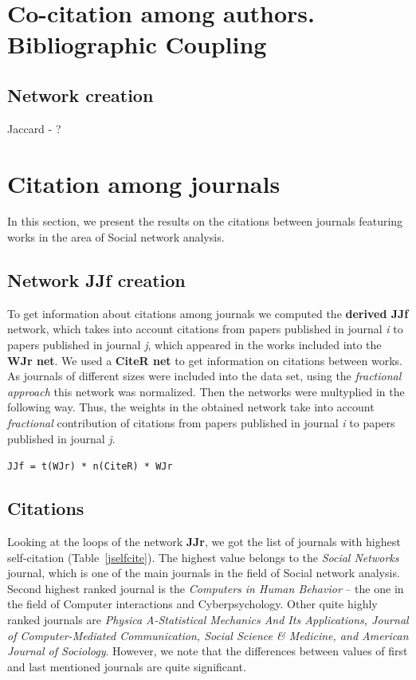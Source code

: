 \documentclass[11pt]{article} %
\newcommand{\Remark}[1]{\ifodd\value{page} \normalmarginpar
 \else \reversemarginpar \fi \marginpar{{\footnotesize #1}} }
\begin{document}
\section{Co-citation among authors. Bibliographic Coupling }

\subsection{Network creation} 

Jaccard - ? \Remark{Try to compute}

\section{Citation among journals}

In this section, we present the results on the citations between journals featuring works in the area of Social network analysis. 

\subsection{Network JJf creation}

To get information about citations among journals we computed the \textbf{derived JJf} network, which takes into account citations from papers published in journal \textit{i} to papers published in journal \textit{j}, which appeared in the works included into the \textbf{WJr net}. We used a \textbf{CiteR net} to get information on citations between works. As journals of different sizes were included into the data set, using the \textit{fractional approach} this network was normalized. Then the networks were multyplied in the following way. Thus, the weights in the obtained network take into account \textit{fractional} contribution of citations from papers published in journal \textit{i} to papers published in journal \textit{j}.   \medskip 

\texttt{JJf = t(WJr) * n(CiteR) * WJr}

\subsection{Citations}

Looking at the loops of the network \textbf{JJr}, we got the list of journals with highest self-citation (Table~\ref{jselfcite}). The highest value belongs to the \textit{Social Networks} journal, which is one of the main journals in the field of Social network analysis. Second highest ranked journal is the \textit{Computers in Human Behavior} -- the one in the field of Computer interactions and Cyberpsychology. Other quite highly ranked journals are \textit{Physica A-Statistical Mechanics And Its Applications, Journal of Computer-Mediated Communication, Social Science \& Medicine, and American Journal of Sociology}. However, we note that the differences between values of first and last mentioned journals are quite significant. \medskip 
\end{document}
